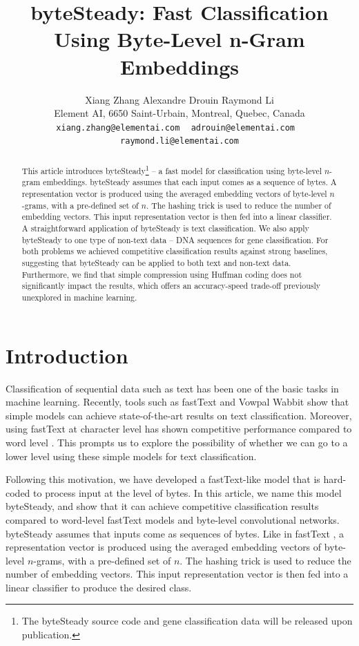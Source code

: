 \documentclass{article}
\title{byteSteady: Fast Classification Using Byte-Level n-Gram Embeddings}
\author{%
  Xiang Zhang \quad Alexandre Drouin \quad Raymond Li \\
  Element AI, 6650 Saint-Urbain, Montreal, Quebec, Canada \\
  \texttt{xiang.zhang@elementai.com} ~ \texttt{adrouin@elementai.com} ~ \texttt{raymond.li@elementai.com} \\
}
\begin{document}
\maketitle

\begin{abstract}
This article introduces byteSteady\footnote{The byteSteady source code and gene classification data will be released upon publication.} -- a fast model for classification using byte-level \(n\)-gram embeddings. byteSteady assumes that each input comes as a sequence of bytes. A representation vector is produced using the averaged embedding vectors of byte-level \(n\)-grams, with a pre-defined set of \(n\). The hashing trick is used to reduce the number of embedding vectors. This input representation vector is then fed into a linear classifier. A straightforward application of byteSteady is text classification. We also apply byteSteady to one type of non-text data -- DNA sequences for gene classification. For both problems we achieved competitive classification results against strong baselines, suggesting that byteSteady can be applied to both text and non-text data. Furthermore, we find that simple compression using Huffman coding does not significantly impact the results, which offers an accuracy-speed trade-off previously unexplored in machine learning.
\end{abstract}

\section{Introduction}

Classification of sequential data such as text has been one of the basic tasks in machine learning. Recently, tools such as fastText \cite{JGBM16} and Vowpal Wabbit \cite{WDLSA09} show that simple models can achieve state-of-the-art results on text classification. Moreover, using fastText at character level has shown competitive performance compared to word level \cite{ZL17}. This prompts us to explore the possibility of whether we can go to a lower level using these simple models for text classification.

Following this motivation, we have developed a fastText-like model that is hard-coded to process input at the level of bytes. In this article, we name this model byteSteady, and show that it can achieve competitive classification results compared to word-level fastText models and byte-level convolutional networks. byteSteady assumes that inputs come as sequences of bytes. Like in fastText \cite{JGBM16}, a representation vector is produced using the averaged embedding vectors of byte-level \(n\)-grams, with a pre-defined set of \(n\). The hashing trick  \cite{WDLSA09} is used to reduce the number of embedding vectors. This input representation vector is then fed into a linear classifier to produce the desired class.
\end{document}
